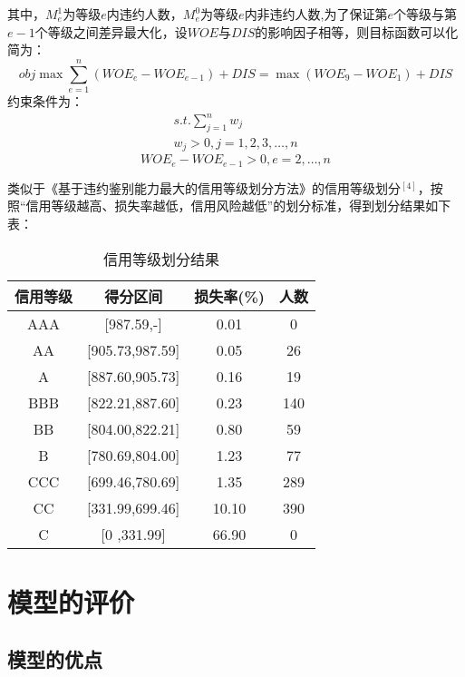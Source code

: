 \documentclass[12pt,a4paper]{nmmcm}
\begin{document}
其中，${M_e^1}$为等级$e$内违约人数，${M_e^0}$为等级$e$内非违约人数,为了保证第$e$个等级与第$e-1$个等级之间差异最大化，设$WOE$与$DIS$的影响因子相等，则目标函数可以化简为：
\begin{equation}
obj\max \sum\limits_{e = 1}^n {(WO{E_e} - WO{E_{e - 1}})+DIS= \max (WO{E_9} - WO{E_1})+DIS}
\end{equation}
约束条件为：
\begin{equation}
\begin{array}{l}
s.t.\sum\limits_{j = 1}^n {{w_j}} \\
{w_j} > 0,j = 1,2,3, \ldots ,n
\end{array}
\end{equation}
\begin{equation}
WO{E_e} - WO{E_{e - 1}} > 0,e = 2, \ldots ,n
\end{equation}

类似于《基于违约鉴别能力最大的信用等级划分方法》的信用等级划分$^{[4]}$，按照“信用等级越高、损失率越低，信用风险越低”的划分标准，得到划分结果如下表：
\begin{table}[H]
    \centering
    \begin{tabular}{cccc}
\hline
信用等级&得分区间&损失率(\%)&人数\\
\hline
AAA	&[987.59,-]&0.01&0\\
AA	&[905.73,987.59]&0.05&26\\
A	&[887.60,905.73]&0.16&19\\
BBB	&[822.21,887.60]&	0.23&140\\
BB	&[804.00,822.21]&0.80&59\\
B   &[780.69,804.00]&	1.23&77\\
CCC	&[699.46,780.69]&	1.35&289\\
CC  &[331.99,699.46]&	10.10&390\\
C   &[0 ,331.99]&66.90&0\\

\hline
    \end{tabular}
    \caption{信用等级划分结果}
    \label{tab:my_credit}
\end{table}

\section{模型的评价}

\subsection{模型的优点}
\end{document}
